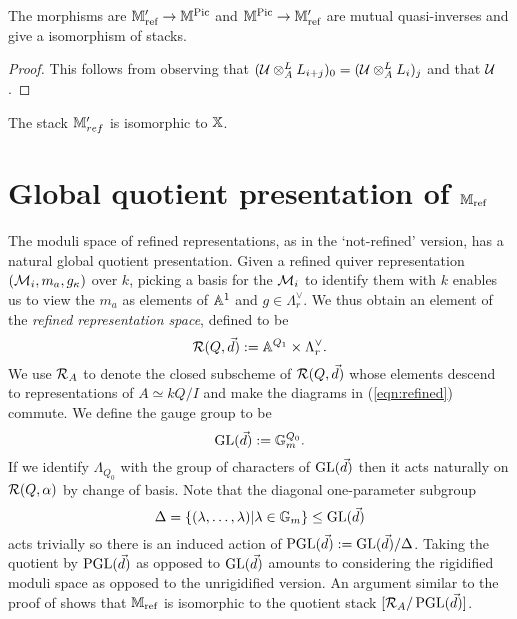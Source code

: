 \documentclass[12pt]{amsart}
\begin{document}
\begin{theorem}
The morphisms are $\mathbb{M}'_{\textup{ref}} \rightarrow \mathbb{M}^{\operatorname{Pic}}$ and $\mathbb{M}^{\operatorname{Pic}} \rightarrow \mathbb{M}_\textup{ref}'$ are mutual quasi-inverses and give a isomorphism of stacks. 
\end{theorem}

\begin{proof}
This follows from observing that $(\mathcal{U} \otimes_A^L L_{i+j})_0 = (\mathcal{U} \otimes_A^L L_i)_j$ and that $\mathcal{U}$.
\end{proof}

\begin{corollary}
The stack $\mathbb{M}_{ref}'$ is isomorphic to $\mathbb{X}$.
\end{corollary}

\section{Global quotient presentation of $\mathbb{M}_\textup{ref}$}

The moduli space of refined representations, as in the `not-refined' version, has a natural global quotient presentation.
Given a refined quiver representation $(\mathcal{M}_i, m_a, g_\kappa)$ over $k$, picking a basis for the $\mathcal{M}_i$ to identify them with $k$ enables us to view the $m_a$ as elements of $\mathbb{A}^1$ and $g\in \Lambda_r^{\vee}$. We thus obtain an element of the {\em refined representation space}, defined  to be \begin{equation*}
\mathcal{R}(Q, \vec{d}) := \mathbb{A}^{Q_1} \times \Lambda_r^{\vee}. \end{equation*}
We use $\mathcal{R}_A$ to denote the closed subscheme of $\mathcal{R}(Q, \vec{d})$ whose elements descend to representations of $A \simeq kQ/I$ and make the diagrams in (\ref{eqn:refined}) commute.
We define the gauge group to be
\begin{equation*}
\operatorname{GL}(\vec{d}) := \mathbb{G}_m^{Q_0}.
\end{equation*}
If we identify $\Lambda_{Q_0}$ with the group of characters of $\operatorname{GL}(\vec{d})$ then it acts naturally on $\mathcal{R}(Q, \alpha)$ by change of basis.
Note that the diagonal one-parameter subgroup 
$$\Delta = \{(\lambda, \ldots,\lambda) | \lambda \in \mathbb{G}_m\} \leq \operatorname{GL}(\vec{d})$$ 
acts trivially so there is an induced action of $\operatorname{PGL}(\vec{d}) := \operatorname{GL}(\vec{d}) / \Delta$.
Taking the quotient by $\operatorname{PGL}(\vec{d})$ as opposed to $\operatorname{GL}(\vec{d})$ amounts to considering the rigidified moduli space as opposed to the unrigidified version. 
An argument similar to the proof of \cite[Proposition 3.9]{Abd} shows that $\mathbb{M}_{\text{ref}}$ is isomorphic to the quotient stack $[\mathcal{R}_A/ \operatorname{PGL}(\vec{d})]$.
\end{document}
